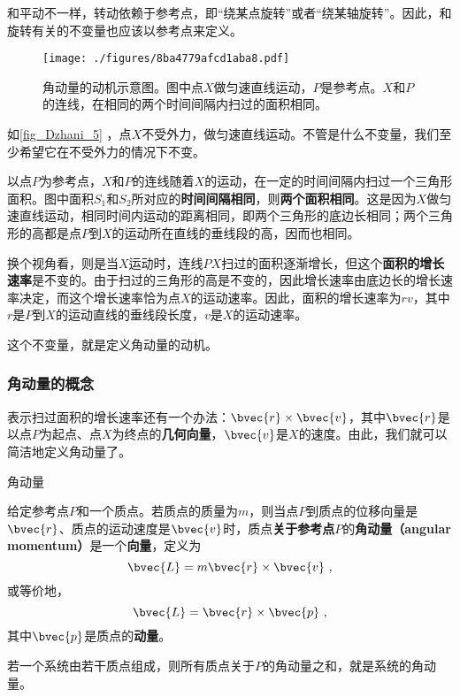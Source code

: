 和平动不一样，转动依赖于参考点，即“绕某点旋转”或者“绕某轴旋转”。因此，和旋转有关的不变量也应该以参考点来定义。


\begin{figure}[ht]
\centering
\texttt{[image: ./figures/8ba4779afcd1aba8.pdf]}
\caption{角动量的动机示意图。图中点$X$做匀速直线运动，$P$是参考点。$X$和$P$的连线，在相同的两个时间间隔内扫过的面积相同。} \label{fig_Dzhani_5}
\end{figure}


如\autoref{fig_Dzhani_5} ，点$X$不受外力，做匀速直线运动。不管是什么不变量，我们至少希望它在不受外力的情况下不变。

以点$P$为参考点，$X$和$P$的连线随着$X$的运动，在一定的时间间隔内扫过一个三角形面积。图中面积$S_1$和$S_2$所对应的\textbf{时间间隔相同}，则\textbf{两个面积相同}。这是因为$X$做匀速直线运动，相同时间内运动的距离相同，即两个三角形的底边长相同；两个三角形的高都是点$P$到$X$的运动所在直线的垂线段的高，因而也相同。



换个视角看，则是当$X$运动时，连线$PX$扫过的面积逐渐增长，但这个\textbf{面积的增长速率}是不变的。由于扫过的三角形的高是不变的，因此增长速率由底边长的增长速率决定，而这个增长速率恰为点$X$的运动速率。因此，面积的增长速率为$rv$，其中$r$是$P$到$X$的运动直线的垂线段长度，$v$是$X$的运动速率。


这个不变量，就是定义角动量的动机。



\subsubsection{角动量的概念}





表示扫过面积的增长速率还有一个办法：$\bvec{r}\times \bvec{v}$，其中$\bvec{r}$是以点$P$为起点、点$X$为终点的\textbf{几何向量}，$\bvec{v}$是$X$的速度。由此，我们就可以简洁地定义角动量了。


\begin{definition}{角动量}

给定参考点$P$和一个质点。若质点的质量为$m$，则当点$P$到质点的位移向量是$\bvec{r}$、质点的运动速度是$\bvec{v}$时，质点\textbf{关于参考点}$P$的\textbf{角动量（angular momentum）}是一个\textbf{向量}，定义为
\begin{equation}
\bvec{L} = m\bvec{r}\times \bvec{v}~, 
\end{equation}
或等价地，
\begin{equation}
\bvec{L} = \bvec{r}\times\bvec{p}~, 
\end{equation}
其中$\bvec{p}$是质点的\textbf{动量}。

若一个系统由若干质点组成，则所有质点关于$P$的角动量之和，就是系统的角动量。

\end{definition}



